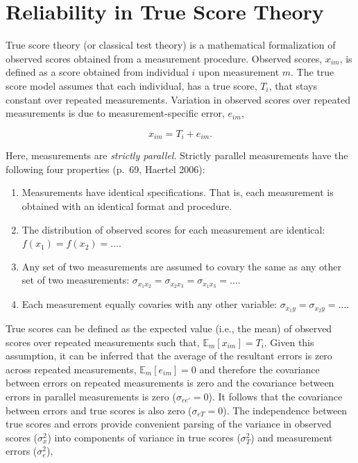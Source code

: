 \documentclass[
  letterpaper,
  DIV=11,
  numbers=noendperiod]{scrreprt}
\providecommand{\tightlist}{%
  \setlength{\itemsep}{0pt}\setlength{\parskip}{0pt}}\usepackage{longtable,booktabs,array}
\begin{document}
\hypertarget{sec-true-score-theory}{%
\section{Reliability in True Score Theory}\label{sec-true-score-theory}}

True score theory (or classical test theory) is a mathematical
formalization of observed scores obtained from a measurement procedure.
Observed scores, \(x_{im}\), is defined as a score obtained from
individual \(i\) upon measurement \(m\). The true score model assumes
that each individual, has a true score, \(T_i\), that stays constant
over repeated measurements. Variation in observed scores over repeated
measurements is due to measurement-specific error, \(e_{im}\),

\[
x_{im} = T_i+e_{im}.
\]

Here, measurements are \emph{strictly parallel}. Strictly parallel
measurements have the following four properties (p.~69, Haertel 2006):

\begin{enumerate}
\def\labelenumi{\arabic{enumi}.}
\tightlist
\item
  Measurements have identical specifications. That is, each measurement
  is obtained with an identical format and procedure.
\item
  The distribution of observed scores for each measurement are
  identical: \(f(x_1) = f(x_2) = \ldots\).
\item
  Any set of two measurements are assumed to covary the same as any
  other set of two measurements:
  \(\sigma_{x_1 x_2} = \sigma_{x_2 x_3} = \sigma_{x_1 x_3} = \ldots\).
\item
  Each measurement equally covaries with any other variable:
  \(\sigma_{x_1 y} = \sigma_{x_2 y} = \ldots\).
\end{enumerate}

True scores can be defined as the expected value (i.e., the mean) of
observed scores over repeated measurements such that,
\(\mathbb{E}_m[x_{im}]=T_{i}\). Given this assumption, it can be
inferred that the average of the resultant errors is zero across
repeated measurements, \(\mathbb{E}_m[e_{im}]=0\) and therefore the
covariance between errors on repeated measurements is zero and the
covariance between errors in parallel measurements is zero
(\(\sigma_{e e'}=0\)). It follows that the covariance between errors and
true scores is also zero (\(\sigma_{eT}=0\)). The independence between
true scores and errors provide convenient parsing of the variance in
observed scores (\(\sigma^2_{x}\)) into components of variance in true
scores (\(\sigma_T^2\)) and measurement errors (\(\sigma_{e}^2\)),
\end{document}
